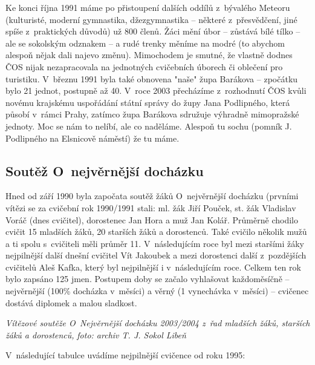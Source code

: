\documentclass[a5paper, 12pt, twoside]{article}
\begin{document}
Ke konci října 1991 máme po přistoupení dalších oddílů z~bývalého
Meteoru (kulturisté, moderní gymnastika, džezgymnastika -- některé
z~přesvědčení, jiné spíše z~praktických důvodů) už 800 členů. Žáci mění
úbor -- zůstává bílé tílko -- ale se sokolským odznakem -- a rudé trenky
měníme na modré (to abychom alespoň nějak dali najevo změnu). Mimochodem
je smutné, že vlastně dodnes ČOS nijak nezapracovala na jednotných
cvičebních úborech či oblečení pro turistiku. V~březnu 1991 byla také
obnovena "naše" župa Barákova -- zpočátku bylo 21 jednot, postupně až
40. V~roce 2003 přecházíme z~rozhodnutí ČOS kvůli novému krajskému
uspořádání státní správy do župy Jana Podlipného, která působí v~rámci
Prahy, zatímco župa Barákova sdružuje výhradně mimopražské jednoty. Moc
se nám to nelíbí, ale co naděláme. Alespoň tu sochu (pomník J.
Podlipného na Elsnicově náměstí) že tu máme.

\subsection{Soutěž O~nejvěrnější
docházku}

Hned od září 1990 byla započata soutěž žáků O~nejvěrnější docházku
(prvními vítězi se za cvičební rok 1990/1991 stali: ml. žák Jiří Pouček,
st. žák Vladislav Voráč (dnes cvičitel), dorostenec Jan Hora a muž Jan
Kolář. Průměrně chodilo cvičit 15 mladších žáků, 20 starších žáků a
dorostenců. Také cvičilo několik mužů a ti spolu s~cvičiteli měli průměr
11. V~následujícím roce byl mezi staršími žáky nejpilnější další dnešní
cvičitel Vít Jakoubek a mezi dorostenci další z~pozdějších cvičitelů
Aleš Kafka, který byl nejpilnější i v~následujícím roce. Celkem ten rok
bylo zapsáno 125 jmen. Postupem doby se začalo vyhlašovat každoměsíčně
-- nejvěrnější (100\% docházka v~měsíci) a věrný (1 vynechávka v~měsíci)
-- cvičenec dostává diplomek a malou sladkost.


\textit{Vítězové soutěže O~Nejvěrnější docházku 2003/2004 z~řad mladších
žáků, starších žáků a dorostenců,} \textit{foto: archiv T. J. Sokol Libeň}

V~následující tabulce uvádíme nejpilnější cvičence od roku 1995:
\end{document}
